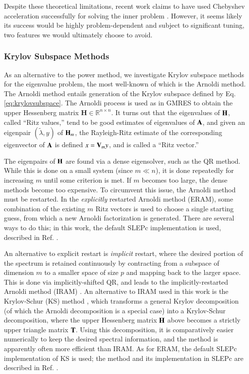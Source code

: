 Despite these theoretical limitations, recent work claims to have 
used Chebyshev acceleration successfully for solving the inner 
problem \cite{zhang2012ehs}.  However, it seems likely its success would 
be highly problem-dependent and subject to significant tuning, two 
features we would ultimately choose to avoid.


\subsubsection{Krylov Subspace Methods}

As an alternative to the power method, we investigate Krylov subspace 
methods for the eigenvalue problem, the most well-known of which is 
the Arnoldi method.  The Arnoldi method entails generation
of the Krylov subspace defined by Eq. \ref{eq:krylovsubspace}.
The Arnoldi process is used as in GMRES to obtain the 
upper Hessenberg matrix $\mathbf{H} \in \mathbb{R}^{n \times n}$. It turns 
out that the eigenvalues of $\mathbf{H}$, called ``Ritz values,'' tend to
be good estimates of eigenvalues of $\mathbf{A}$, and given an eigenpair
$(\tilde{\lambda}, y)$ of $\mathbf{H}_m$, the Rayleigh-Ritz estimate of the
corresponding eigenvector of $\mathbf{A}$ is defined $x = \mathbf{V}_m y$, 
and is called a ``Ritz vector.''

The eigenpairs of $\mathbf{H}$ are found via a dense eigensolver, such as 
the QR method.  While this is done on a small system (since $m \ll n$), 
it is done repeatedly for increasing $m$ until some criterion is met.  
If $m$ becomes too large, the dense methods become too expensive.  To 
circumvent this issue, the Arnoldi method must be restarted.  In 
the {\it explicitly} restarted Arnoldi method (ERAM), some combination of 
the existing $m$ Ritz vectors is used to choose a single starting guess, 
from which a new Arnoldi factorization is generated.  There are several ways 
to do this; in this work, the default SLEPc implementation is used, 
described in Ref. \cite{slepc-str-4}.

An alternative to explicit restart is {\it implicit} restart, where the 
desired portion of the spectrum is retained continuously by contracting 
from a subspace of dimension $m$ to a smaller space of size $p$ and mapping 
back to the larger space.  This is done via implicitly-shifted QR, and leads 
to the implicitly-restarted Arnoldi method (IRAM) \cite{sorensen1992iap}.  
An alternative to IRAM used in this work is the Krylov-Schur (KS) method
\cite{stewart2002ksa}, which transforms a general Krylov decomposition 
(of which the Arnoldi decomposition is a special case) into a Krylov-Schur 
decomposition,
where the upper Hessenberg matrix $\mathbf{H}$ above becomes a strictly upper
triangle matrix $\mathbf{T}$.  Using this decomposition, it is comparatively
easier numerically to keep the desired spectral information, and the method is
apparently often more efficient than IRAM.  As for ERAM, the default SLEPc
implementation of KS is used; the method and its implementation in SLEPc are
described in Ref. \cite{slepc-str-7}.

